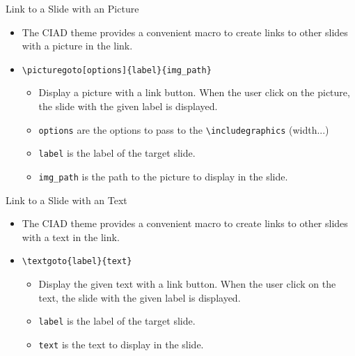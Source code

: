 \documentclass[english,sectioncirclenumberstyle]{ciadbeamer}
\begin{document}
\begin{frame}[t]{Link to a Slide with an Picture}
	\begin{itemize}
	\item The CIAD theme provides a convenient macro to create links to other slides with a picture in the link.
	\item \texttt{{\textbackslash}picturegoto[options]\{label\}\{img\_path\}}
		\begin{itemize}
		\item Display a picture with a link button. When the user click on the picture, the slide with the given label is displayed.
		\item \texttt{options} are the options to pass to the \texttt{{\textbackslash}includegraphics} (width...)
		\item \texttt{label} is the label of the target slide.
		\item \texttt{img\_path} is the path to the picture to display in the slide.
		\end{itemize}
	\end{itemize}
	\begin{center}
	\end{center}
\end{frame}

\begin{frame}{Link to a Slide with an Text}
	\begin{itemize}
	\item The CIAD theme provides a convenient macro to create links to other slides with a text in the link.
	\item \texttt{{\textbackslash}textgoto\{label\}\{text\}}
		\begin{itemize}
		\item Display the given text with a link button. When the user click on the text, the slide with the given label is displayed.
		\item \texttt{label} is the label of the target slide.
		\item \texttt{text} is the text to display in the slide.
		\end{itemize}
	\end{itemize}
	\begin{center}
	\end{center}
\end{frame}
\end{document}
